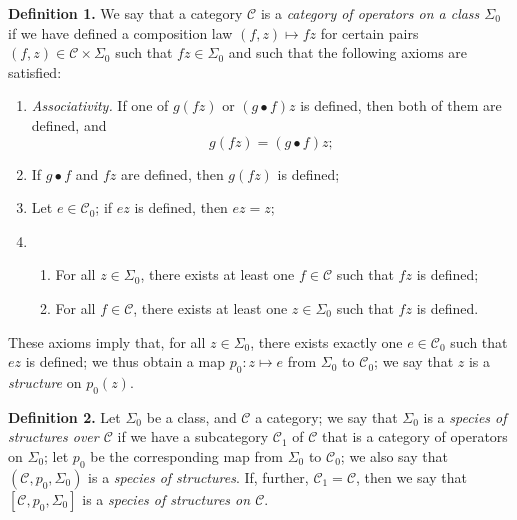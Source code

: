 \documentclass[fleqn]{article}
\newenvironment{rmenv}[1]
  {\phantomsection\par\medskip\noindent\textbf{#1.}\rmfamily}
  {\par\medskip}
\newcommand{\CC}{\mathcal{C}}
\begin{document}
\begin{rmenv}{Definition 1}
  We say that a category $\CC$ is a \emph{category of operators on a class $\Sigma_0$} if we have defined a composition law $(f,z)\mapsto fz$ for certain pairs $(f,z)\in\CC\times\Sigma_0$ such that $fz\in\Sigma_0$ and such that the following axioms are satisfied:
  \begin{enumerate}
    \item[1.]
      \emph{Associativity.}
      If one of $g(fz)$ or $(g\bullet f)z$ is defined, then both of them are defined, and
      \[
        g(fz)
        = (g\bullet f)z;
      \]
    \item[2.]
      If $g\bullet f$ and $fz$ are defined, then $g(fz)$ is defined;
    \item[3.]
      Let $e\in\CC_0$;
      if $ez$ is defined, then $ez=z$;
    \item[4.]
      \begin{enumerate}
        \item[(a)]
          For all $z\in\Sigma_0$, there exists at least one $f\in\CC$ such that $fz$ is defined;
        \item[(b)]
          For all $f\in\CC$, there exists at least one $z\in\Sigma_0$ such that $fz$ is defined.
      \end{enumerate}
  \end{enumerate}
\end{rmenv}

These axioms imply that, for all $z\in\Sigma_0$, there exists exactly one $e\in\CC_0$ such that $ez$ is defined;
we thus obtain a map $p_0\colon z\mapsto e$ from $\Sigma_0$ to $\CC_0$;
we say that $z$ is a \emph{structure} on $p_0(z)$.

\begin{rmenv}{Definition 2}
  Let $\Sigma_0$ be a class, and $\CC$ a category;
  we say that $\Sigma_0$ is a \emph{species of structures over $\CC$} if we have a subcategory $\CC_1$ of $\CC$ that is a category of operators on $\Sigma_0$;
  let $p_0$ be the corresponding map from $\Sigma_0$ to $\CC_0$;
  we also say that $(\CC,p_0,\Sigma_0)$ is a \emph{species of structures}.
  If, further, $\CC_1=\CC$, then we say that $[\CC,p_0,\Sigma_0]$ is a \emph{species of structures on $\CC$}.
\end{rmenv}
\end{document}
